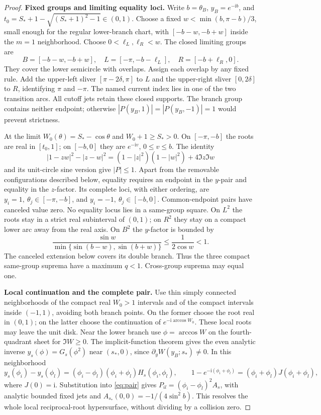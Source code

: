 \documentclass[11pt]{article}
\numberwithin{equation}{section}
\theoremstyle{definition}
\newcommand{\ii}{\mathrm i}
\begin{document}
\begin{proof}
\noindent\textbf{Fixed groups and limiting equality loci.}
Write \(b=\theta_B\), \(y_B=e^{-\ii b}\), and
\(t_0=S_*+1-\sqrt{(S_*+1)^2-1}\in(0,1)\).
Choose a fixed \(w<\min(b,\pi-b)/3\), small enough for the
regular lower-branch chart, with \([-b-w,-b+w]\) inside the
\(m=1\) neighborhood. Choose \(0<\ell_L,\ell_R<w\).
The closed limiting groups are
\[
 B=[-b-w,-b+w],\quad L=[-\pi,-b-\ell_L],\quad
 R=[-b+\ell_R,0].
\]
They cover the lower semicircle with overlaps. Assign each overlap
by any fixed rule. Add the upper-left sliver \([\pi-2\delta,\pi]\)
to \(L\) and the upper-right sliver \([0,2\delta]\) to \(R\),
identifying \(\pi\) and \(-\pi\). The named current index lies
in one of the two transition arcs. All cutoff jets retain these
closed supports. The branch group contains neither endpoint;
otherwise \(|P(y_B,1)|=|P(y_B,-1)|=1\) would prevent strictness.

At the limit \(W_0(\theta)=S_*-\cos\theta\) and
\(W_0+1\ge S_*>0\). On \([-\pi,-b]\) the roots are real
in \([t_0,1]\); on \([-b,0]\) they are \(e^{-\ii v}\),
\(0\le v\le b\). The identity
\[
 |1-zw|^2-|z-w|^2
 =(1-|z|^2)(1-|w|^2)+4\Im z\Im w
\]
and its unit-circle sine version give \(|P|\le1\).
Apart from the removable configurations described below, equality
requires an endpoint in the \(y\)-pair and equality in the
\(z\)-factor. Its complete loci, with either ordering, are
\(y_i=1,\ \theta_j\in[-\pi,-b]\), and
\(y_i=-1,\ \theta_j\in[-b,0]\). Common-endpoint pairs have
canceled value zero. No equality locus lies in a same-group square.
On \(L^2\) the roots stay in a strict real subinterval of \((0,1)\);
on \(R^2\) they stay on a compact lower arc away from the real axis.
On \(B^2\) the \(y\)-factor is bounded by
\[
 \frac{\sin w}{\min\{\sin(b-w),\sin(b+w)\}}
 \le\frac1{2\cos w}<1.
\]
The canceled extension below covers its double branch. Thus
the three compact same-group suprema have a maximum \(q<1\).
Cross-group suprema may equal one.

\par\smallskip\noindent\textbf{Local continuation and the complete pair.}
Use thin simply connected neighborhoods of the compact real
\(W_0>1\) intervals and of the compact intervals inside \((-1,1)\),
avoiding both branch points. On the former choose the root real
in \((0,1)\); on the latter choose the continuation of
\(e^{-\ii\arccos W_0}\). These local roots may leave the unit disk.
Near the lower branch use \(\phi=\arccos W\) on the
fourth-quadrant sheet for \(\Im W\ge0\).
The implicit-function theorem gives the even analytic inverse
\(y_s(\phi)=G_s(\phi^2)\) near \((s_*,0)\), since
\(\partial_yW(y_B;s_*)\ne0\). In this neighborhood
\[
 y_s(\phi_i)-y_s(\phi_l)
  =(\phi_i-\phi_l)(\phi_i+\phi_l)H_s(\phi_i,\phi_l),\qquad
 1-e^{-\ii(\phi_i+\phi_l)}=(\phi_i+\phi_l)J(\phi_i+\phi_l),
\]
where \(J(0)=\ii\). Substitution into \eqref{eq:pair} gives
\(P_{il}=(\phi_i-\phi_l)^2A_s\), with analytic bounded fixed
jets and \(A_{s_*}(0,0)=-1/(4\sin^2b)\).
This resolves the whole local reciprocal-root hypersurface,
without dividing by a collision zero.


\end{proof}
\end{document}
